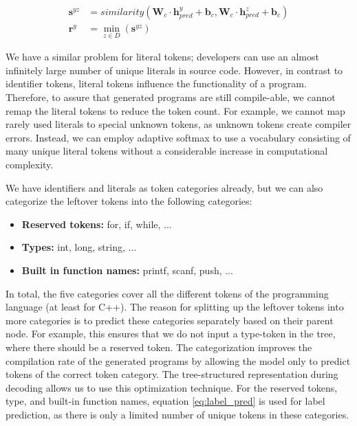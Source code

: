 \begin{align}
    \mathbf{s}^{yz} &= similarity(\mathbf{W}_c \cdot \mathbf{h}^y_{pred} + \mathbf{b}_c,  \mathbf{W}_c \cdot \mathbf{h}^z_{pred} + \mathbf{b}_c) \\
    \mathbf{r}^y &= \min_{z \in D}(\mathbf{s}^{yz})
\end{align}



We have a similar problem for literal tokens; developers can use an almost infinitely large number of unique literals in source code. However, in contrast to identifier tokens, literal tokens influence the functionality of a program. Therefore, to assure that generated programs are still compile-able, we cannot remap the literal tokens to reduce the token count. For example, we cannot map rarely used literals to special unknown tokens, as unknown tokens create compiler errors. Instead, we can employ adaptive softmax \cite{grave2017efficient} to use a vocabulary consisting of many unique literal tokens without a considerable increase in computational complexity.



We have identifiers and literals as token categories already, but we can also categorize the leftover tokens into the following categories:

\begin{itemize}
    \item \textbf{Reserved tokens:} for, if, while, ...
    \item \textbf{Types:} int, long, string, ...
    \item \textbf{Built in function names:} printf, scanf, push, ...
\end{itemize}



In total, the five categories cover all the different tokens of the programming language (at least for C++). The reason for splitting up the leftover tokens into more categories is to predict these categories separately based on their parent node. For example, this ensures that we do not input a type-token in the tree, where there should be a reserved token. The categorization improves the compilation rate of the generated programs by allowing the model only to predict tokens of the correct token category. The tree-structured representation during decoding allows us to use this optimization technique. For the reserved tokens, type, and built-in function names, equation \ref{eq:label_pred} is used for label prediction, as there is only a limited number of unique tokens in these categories. 



